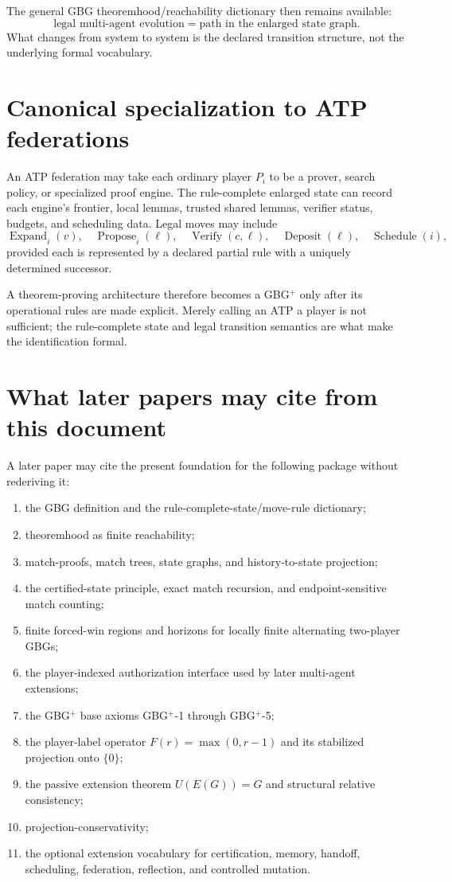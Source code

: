 \documentclass[11pt]{article}
\theoremstyle{definition}
\theoremstyle{remark}
\begin{document}
The general GBG theoremhood/reachability dictionary then remains available:
\[
\boxed{\text{legal multi-agent evolution}=\text{path in the enlarged state graph}.}
\]
What changes from system to system is the declared transition structure, not the underlying formal vocabulary.

\section{Canonical specialization to ATP federations}

An ATP federation may take each ordinary player $P_i$ to be a prover, search policy, or specialized proof engine.  The rule-complete enlarged state can record each engine's frontier, local lemmas, trusted shared lemmas, verifier status, budgets, and scheduling data.  Legal moves may include
\[
\operatorname{Expand}_i(v),\quad
\operatorname{Propose}_i(\ell),\quad
\operatorname{Verify}(c,\ell),\quad
\operatorname{Deposit}(\ell),\quad
\operatorname{Schedule}(i),
\]
provided each is represented by a declared partial rule with a uniquely determined successor.

A theorem-proving architecture therefore becomes a GBG$^{+}$ only after its operational rules are made explicit.  Merely calling an ATP a player is not sufficient; the rule-complete state and legal transition semantics are what make the identification formal.

\section{What later papers may cite from this document}

A later paper may cite the present foundation for the following package without rederiving it:
\begin{enumerate}[leftmargin=1.6em]
\item the GBG definition and the rule-complete-state/move-rule dictionary;
\item theoremhood as finite reachability;
\item match-proofs, match trees, state graphs, and history-to-state projection;
\item the certified-state principle, exact match recursion, and endpoint-sensitive match counting;
\item finite forced-win regions and horizons for locally finite alternating two-player GBGs;
\item the player-indexed authorization interface used by later multi-agent extensions;
\item the GBG$^{+}$ base axioms GBG$^{+}$-1 through GBG$^{+}$-5;
\item the player-label operator $F(r)=\max(0,r-1)$ and its stabilized projection onto $\{0\}$;
\item the passive extension theorem $U(E(G))=G$ and structural relative consistency;
\item projection-conservativity;
\item the optional extension vocabulary for certification, memory, handoff, scheduling, federation, reflection, and controlled mutation.
\end{enumerate}
\end{document}
